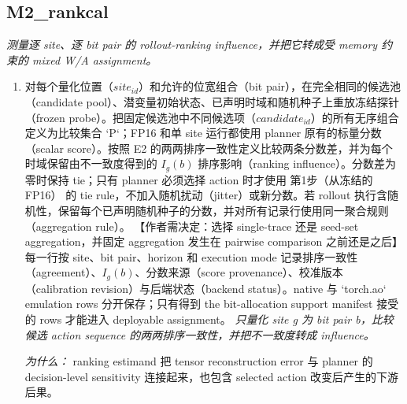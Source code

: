 \documentclass[10pt,a4paper]{article}
\begin{document}
\subsection*{M2\_rankcal}
\emph{测量逐 site、逐 bit pair 的 rollout-ranking influence，并把它转成受 memory 约束的 mixed W/A assignment。}
\begin{enumerate}[leftmargin=*,start=2]
  \item 对每个量化位置（\(site_{id}\)）和允许的位宽组合（bit pair），在完全相同的候选池（candidate pool）、潜变量初始状态、已声明时域和随机种子上重放冻结探针（frozen probe）。把固定候选池中不同候选项（\(candidate_{id}\)）的所有无序组合定义为比较集合 `P`；FP16 和单 site 运行都使用 planner 原有的标量分数（scalar score）。按照 E2 的两两排序一致性定义比较两条分数差，并为每个时域保留由不一致度得到的 \(I_{g}(b)\) 排序影响（ranking influence）。分数差为零时保持 tie；只有 planner 必须选择 action 时才使用 第1步（从冻结的 FP16） 的 tie rule，不加入随机扰动（jitter）或新分数。若 rollout 执行含随机性，保留每个已声明随机种子的分数，并对所有记录行使用同一聚合规则（aggregation rule）。 【作者需决定：选择 single-trace 还是 seed-set aggregation，并固定 aggregation 发生在 pairwise comparison 之前还是之后】 每一行按 site、bit pair、horizon 和 execution mode 记录排序一致性（agreement）、\(I_{g}(b)\)、分数来源（score provenance）、校准版本（calibration revision）与后端状态（backend status）。native 与 `torch.ao` emulation rows 分开保存；只有得到 the bit-allocation support manifest 接受的 rows 才能进入 deployable assignment。
\noindent\emph{只量化 site g 为 bit pair b，比较候选 action sequence 的两两排序一致性，并把不一致度转成 influence。}
\par{}
\par\emph{为什么：} ranking estimand 把 tensor reconstruction error 与 planner 的 decision-level sensitivity 连接起来，也包含 selected action 改变后产生的下游后果。

\end{enumerate}
\end{document}
